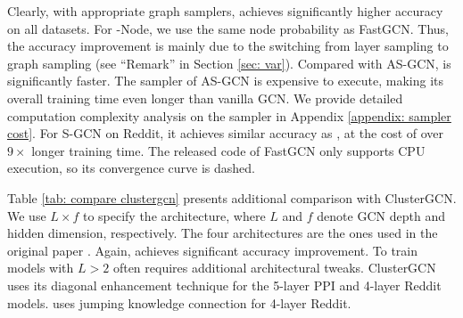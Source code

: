 Clearly, with appropriate graph samplers, {\graphsaint} achieves significantly higher accuracy on all datasets. 
For {\graphsaint}-Node, we use the same node probability as FastGCN. Thus, the accuracy improvement is mainly due to the switching from layer sampling to graph sampling (see ``Remark'' in Section \ref{sec: var}). 
Compared with AS-GCN, {\graphsaint} is significantly faster. The sampler of AS-GCN is expensive to execute, making its overall training time even longer than vanilla GCN. We provide detailed computation complexity analysis on the sampler in Appendix \ref{appendix: sampler cost}. 
For S-GCN on Reddit, it achieves similar accuracy as {\graphsaint}, at the cost of over $9\times$ longer training time. 
The released code of FastGCN only supports CPU execution, so its convergence curve is dashed. 


Table \ref{tab: compare clustergcn} presents additional comparison with ClusterGCN. We use $L\times f$ to specify the architecture, where $L$ and $f$ denote GCN depth and hidden dimension, respectively. 
The four architectures are the ones used in the original paper \citep{cluster-gcn}. Again, {\graphsaint} achieves significant accuracy improvement. 
To train models with $L>2$ often requires additional architectural tweaks. ClusterGCN uses its diagonal enhancement technique for the 5-layer PPI and 4-layer Reddit models. {\graphsaint} uses jumping knowledge connection \citep{jk-net} for 4-layer Reddit. 


